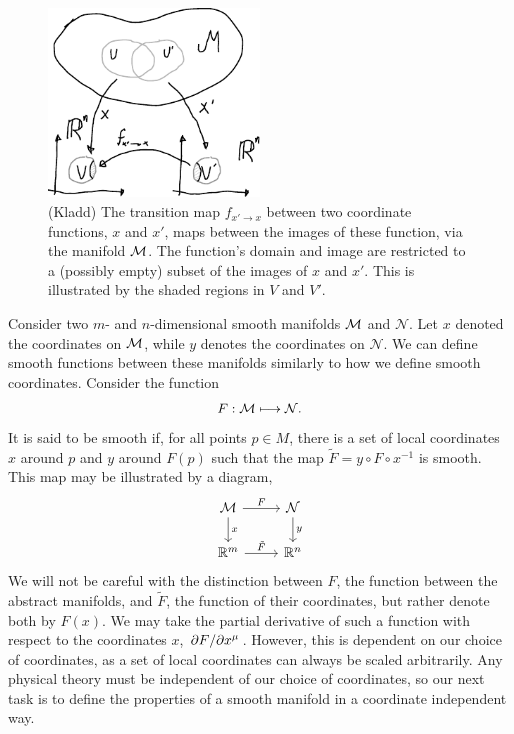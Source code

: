 \begin{figure}
    \centering
    \includegraphics[width=0.5\textwidth]{figurer/transition_map_kladsvg.pdf}
    \caption{
        (Kladd) The transition map $f_{x'\rightarrow x}$ between two coordinate functions, $x$ and $x'$, maps between the images of these function, via the manifold $\mathcal{M}$. The function's domain and image are restricted to a (possibly empty) subset of the images of $x$ and $x'$. This is illustrated by the shaded regions in $V$ and $V'$. 
        }
    \label{fig: transition map}
\end{figure}

Consider two $m$- and $n$-dimensional smooth manifolds $\mathcal{M}$ and $\mathcal N$.
Let $x$ denoted the coordinates on $\mathcal{M}$, while $y$ denotes the coordinates on $\mathcal N$.
We can define smooth functions between these manifolds similarly to how we define smooth coordinates.
Consider the function
%
\begin{equation}
    F: \mathcal{M} \longmapsto \mathcal N.
\end{equation}
%
It is said to be smooth if, for all points $p \in M$, there is a set of local coordinates $x$ around $p$ and $y$ around $F(p)$ such that the map $\tilde F = y \circ F \circ x^{-1}$ is smooth.
This map may be illustrated by a diagram,
%
\begin{equation}
\begin{tikzcd}
    \mathcal M \arrow[d, "x"] \arrow[r, "F"] & \mathcal N \arrow[d, "y"] \\
    \mathbb R^m \arrow[r, "\tilde F"]               & \mathbb R^n              
    \end{tikzcd}
\end{equation}
%
%
We will not be careful with the distinction between $F$, the function between the abstract manifolds, and $\tilde F$, the function of their coordinates, but rather denote both by $F(x)$.
We may take the partial derivative of such a function with respect to the coordinates $x$, $\pdv{F}/{x^\mu}$.
However, this is dependent on our choice of coordinates, as a set of local coordinates can always be scaled arbitrarily.
Any physical theory must be independent of our choice of coordinates, so our next task is to define the properties of a smooth manifold in a coordinate independent way.


